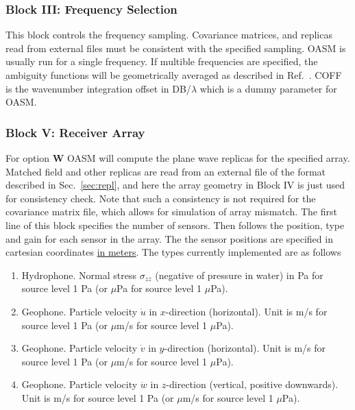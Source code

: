 \subsubsection{Block III: Frequency Selection}

This block controls the frequency sampling. Covariance matrices,
and replicas read from external files must be consistent with the
specified sampling. OASM is usually run for a single frequency. If
multible frequencies are specified, the ambiguity functions will be
geometrically averaged as described in Ref.~\cite{bks:jasa88}.
COFF \rm is the wavenumber integration offset in DB/$\lambda$ which is
a dummy parameter for OASM. 
 
\subsubsection{Block V: Receiver Array}

For option {\bf W} OASM will compute the plane wave replicas for the
specified array. Matched field and other replicas are read from an
external
file of the format described in Sec.~\ref{sec:repl}, and here the
array geometry in Block IV is just used for consistency check. Note
that such a consistency is not required for the covariance matrix
file, which allows for simulation of array mismatch.
The first line of this block specifies the
number of sensors. Then follows the position, type and gain for each
sensor in the array. The the sensor positions are specified in
cartesian coordinates \underline{in meters}. The types currently
implemented are as follows

\begin{enumerate}
\item Hydrophone. Normal stress $ \sigma_{zz}$ (negative of pressure in
water) in Pa for source level 1 Pa (or $\mu$Pa for source level 1 $\mu$Pa). 
\item Geophone. Particle velocity $\dot{u}$ in $x$-direction
(horizontal).  Unit is
m/s for source level 1 Pa (or $\mu$m/s for source level 1 $\mu$Pa).
\item Geophone. Particle velocity $\dot{v}$ in $y$-direction
(horizontal).  Unit is
m/s for source level 1 Pa (or $\mu$m/s for source level 1 $\mu$Pa).
\item Geophone. Particle velocity $\dot{w}$ in $z$-direction
(vertical, positive downwards).  Unit is
m/s for source level 1 Pa (or $\mu$m/s for source level 1 $\mu$Pa).
\end{enumerate}

